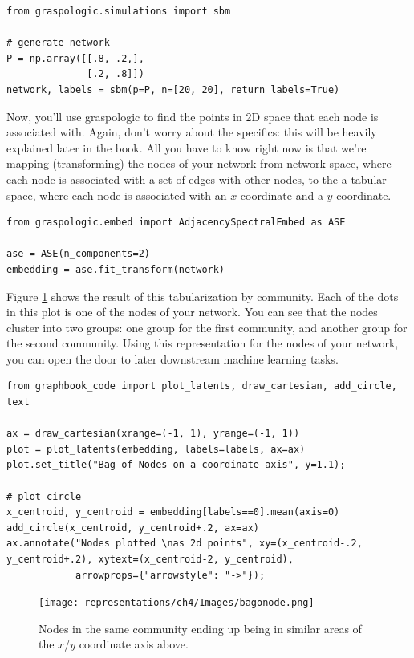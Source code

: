 \begin{lstlisting}[style=python]
from graspologic.simulations import sbm

# generate network
P = np.array([[.8, .2,],
              [.2, .8]])
network, labels = sbm(p=P, n=[20, 20], return_labels=True)
\end{lstlisting}

Now, you'll use graspologic to find the points in 2D space that each node is associated with. Again, don't worry about the specifics: this will be heavily explained later in the book. All you have to know right now is that we're {mapping} (transforming) the nodes of your network from network space, where each node is associated with a set of edges with other nodes, to the a tabular space, where each node is associated with an $x$-coordinate and a $y$-coordinate.

\begin{lstlisting}[style=python]
from graspologic.embed import AdjacencySpectralEmbed as ASE

ase = ASE(n_components=2)
embedding = ase.fit_transform(network)
\end{lstlisting}

Figure \ref{fig:ch4:bagonode} shows the result of this tabularization by community. Each of the dots in this plot is one of the nodes of your network. You can see that the nodes cluster into two groups: one group for the first community, and another group for the second community. Using this representation for the nodes of your network, you can open the door to later downstream machine learning tasks.

\begin{lstlisting}[style=python]
from graphbook_code import plot_latents, draw_cartesian, add_circle, text

ax = draw_cartesian(xrange=(-1, 1), yrange=(-1, 1))
plot = plot_latents(embedding, labels=labels, ax=ax)
plot.set_title("Bag of Nodes on a coordinate axis", y=1.1);

# plot circle
x_centroid, y_centroid = embedding[labels==0].mean(axis=0)
add_circle(x_centroid, y_centroid+.2, ax=ax)
ax.annotate("Nodes plotted \nas 2d points", xy=(x_centroid-.2, y_centroid+.2), xytext=(x_centroid-2, y_centroid), 
            arrowprops={"arrowstyle": "->"});
\end{lstlisting}
\begin{figure}[h]
    \centering
    \texttt{[image: representations/ch4/Images/bagonode.png]}
    \caption{Nodes in the same community ending up being in similar areas of the $x$/$y$ coordinate axis above.}
    \label{fig:ch4:bagonode}
\end{figure}

